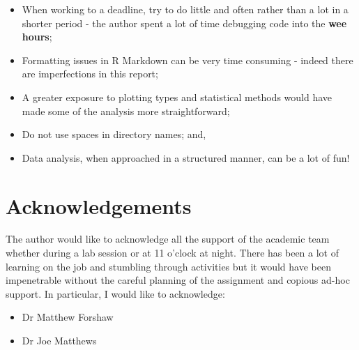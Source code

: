 \documentclass[
]{article}
\begin{document}
\begin{itemize}
\item
  When working to a deadline, try to do little and often rather than a
  lot in a shorter period - the author spent a lot of time debugging
  code into the \textbf{wee hours};
\item
  Formatting issues in R Markdown can be very time consuming - indeed
  there are imperfections in this report;
\item
  A greater exposure to plotting types and statistical methods would
  have made some of the analysis more straightforward;
\item
  Do not use spaces in directory names; and,
\item
  Data analysis, when approached in a structured manner, can be a lot of
  fun!
\end{itemize}

\hypertarget{acknowledgements}{%
\section{Acknowledgements}\label{acknowledgements}}

The author would like to acknowledge all the support of the academic
team whether during a lab session or at 11 o'clock at night. There has
been a lot of learning on the job and stumbling through activities but
it would have been impenetrable without the careful planning of the
assignment and copious ad-hoc support. In particular, I would like to
acknowledge:

\begin{itemize}
\item
  Dr Matthew Forshaw
\item
  Dr Joe Matthews
\end{itemize}
\end{document}
